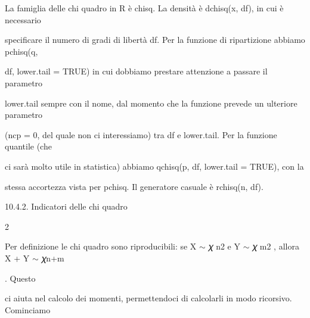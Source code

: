 \documentclass[a4paper,portrait,12pt]{article}
\begin{document}
\begin{flushleft}
La famiglia delle chi quadro in R \`{e} chisq. La densit\`{a} \`{e} dchisq(x, df), in cui \`{e} necessario
\end{flushleft}


\begin{flushleft}
specificare il numero di gradi di libert\`{a} df. Per la funzione di ripartizione abbiamo pchisq(q,
\end{flushleft}


\begin{flushleft}
df, lower.tail = TRUE) in cui dobbiamo prestare attenzione a passare il parametro
\end{flushleft}


\begin{flushleft}
lower.tail sempre con il nome, dal momento che la funzione prevede un ulteriore parametro
\end{flushleft}


\begin{flushleft}
(ncp = 0, del quale non ci interessiamo) tra df e lower.tail. Per la funzione quantile (che
\end{flushleft}


\begin{flushleft}
ci sar\`{a} molto utile in statistica) abbiamo qchisq(p, df, lower.tail = TRUE), con la
\end{flushleft}


\begin{flushleft}
stessa accortezza vista per pchisq. Il generatore casuale \`{e} rchisq(n, df).
\end{flushleft}





\begin{flushleft}
10.4.2. Indicatori delle chi quadro
\end{flushleft}


2


\begin{flushleft}
Per definizione le chi quadro sono riproducibili: se X $\sim$ 𝜒 n2 e Y $\sim$ 𝜒 m2 , allora X + Y $\sim$ 𝜒n+m
\end{flushleft}


\begin{flushleft}
. Questo
\end{flushleft}


\begin{flushleft}
ci aiuta nel calcolo dei momenti, permettendoci di calcolarli in modo ricorsivo. Cominciamo
\end{flushleft}
\end{document}

